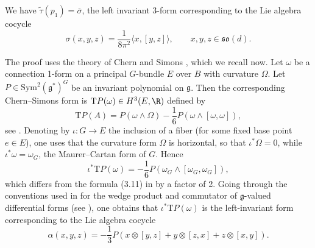 \begin{Lemma}
\label{SecondLemmaA}
We have $\tilde{\tau}(p_1) = \overline{\sigma}$, the left invariant $3$-form corresponding to the Lie algebra cocycle
\begin{equation*}
 \sigma(x, y, z) = \frac{1}{8 \pi^2} \langle x, [y, z] \rangle, \qquad x, y, z \in \mathfrak{so}(d).	
\end{equation*}
\end{Lemma}

The proof uses the theory of Chern and Simons \cite{ChernSimons}, which we recall now.
Let $\omega$ be a connection 1-form on a principal $G$-bundle $E$ over $B$ with curvature $\Omega$.
Let $P \in \mathrm{Sym}^2(\mathfrak{g}^*)^G$ be an invariant polynomial on $\mathfrak{g}$.
Then the corresponding Chern--Simons form is $\mathrm{T}P(\omega) \in H^3(E, \R)$ defined by
\begin{equation*}
 \mathrm{T}P(A) = P(\omega \wedge \Omega) - \frac{1}{6} P(\omega \wedge [\omega, \omega]),
\end{equation*}
see \cite[formula~(3.5)]{ChernSimons}.
Denoting by $\iota \colon G \to E$ the inclusion of a fiber (for some fixed base point~$e \in E$), one uses that the curvature form $\Omega$ is horizontal, so that $\iota^*\Omega = 0$, while $\iota^*\omega = \omega_G$, the Maurer--Cartan form of $G$.
Hence
\begin{equation*}
\iota^*\mathrm{T}P(\omega) = -\frac{1}{6} P(\omega_G \wedge [\omega_G, \omega_G]),
\end{equation*}
which differs from the formula (3.11) in \cite{ChernSimons} by a factor of 2.
Going through the conventions used in \cite{ChernSimons} for the wedge product and commutator of $\mathfrak{g}$-valued differential forms (see \cite[p.~50]{ChernSimons}), one obtains that $\iota^* \mathrm{T}P(\omega)$ is the left-invariant form corresponding to the Lie algebra cocycle
\begin{equation}
\label{DefinitionAlpha}
 \alpha(x, y, z) =	- \frac{1}{3} P(x \otimes [y, z] + y \otimes [z, x] + z \otimes [x, y]).
\end{equation}

